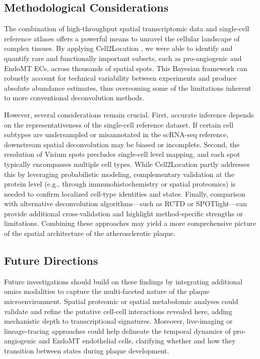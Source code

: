 \documentclass[a4paper,12pt]{article}
\begin{document}
\subsection{Methodological Considerations}
The combination of high-throughput spatial transcriptomic data and single-cell reference atlases offers a powerful means to unravel the cellular landscape of complex tissues. By applying Cell2Location \citep{Kleshchevnikov2022-vd}, we were able to identify and quantify rare and functionally important subsets, such as pro-angiogenic and EndoMT ECs, across thousands of spatial spots. This Bayesian framework can robustly account for technical variability between experiments and produce absolute abundance estimates, thus overcoming some of the limitations inherent to more conventional deconvolution methods.

However, several considerations remain crucial. First, accurate inference depends on the representativeness of the single-cell reference dataset. If certain cell subtypes are undersampled or misannotated in the scRNA-seq reference, downstream spatial deconvolution may be biased or incomplete. Second, the resolution of Visium spots precludes single-cell level mapping, and each spot typically encompasses multiple cell types. While Cell2Location partly addresses this by leveraging probabilistic modeling, complementary validation at the protein level (e.g., through immunohistochemistry or spatial proteomics) is needed to confirm localized cell-type identities and states. Finally, comparison with alternative deconvolution algorithms—such as RCTD or SPOTlight—can provide additional cross-validation and highlight method-specific strengths or limitations. Combining these approaches may yield a more comprehensive picture of the spatial architecture of the atherosclerotic plaque.

\subsection{Future Directions}
Future investigations should build on these findings by integrating additional omics modalities to capture the multi-faceted nature of the plaque microenvironment. Spatial proteomic or spatial metabolomic analyses could validate and refine the putative cell-cell interactions revealed here, adding mechanistic depth to transcriptional signatures. Moreover, live-imaging or lineage-tracing approaches could help delineate the temporal dynamics of pro-angiogenic and EndoMT endothelial cells, clarifying whether and how they transition between states during plaque development.
\end{document}
